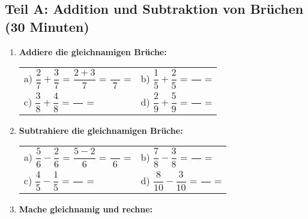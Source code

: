 \subsection*{Teil A: Addition und Subtraktion von Brüchen (30 Minuten)}

\begin{enumerate}[label=\arabic*.]
    \item \textbf{Addiere die gleichnamigen Brüche:}

    \vspace{0.5cm}
    \begin{tabular}{ll}
        a) $\dfrac{2}{7} + \dfrac{3}{7}$ = $\dfrac{2+3}{7}$ = $\dfrac{\phantom{00}}{7}$ = \underline{\hspace{3cm}} & 
        b) $\dfrac{1}{5} + \dfrac{2}{5}$ = $\dfrac{\phantom{00}}{\phantom{00}}$ = \underline{\hspace{3cm}} \\[4ex]
        c) $\dfrac{3}{8} + \dfrac{4}{8}$ = $\dfrac{\phantom{00}}{\phantom{00}}$ = \underline{\hspace{3cm}} & 
        d) $\dfrac{2}{9} + \dfrac{5}{9}$ = $\dfrac{\phantom{00}}{\phantom{00}}$ = \underline{\hspace{3cm}}
    \end{tabular}

    \vspace{1cm}

    \item \textbf{Subtrahiere die gleichnamigen Brüche:}

    \vspace{0.5cm}
    \begin{tabular}{ll}
        a) $\dfrac{5}{6} - \dfrac{2}{6}$ = $\dfrac{5-2}{6}$ = $\dfrac{\phantom{00}}{6}$ = \underline{\hspace{3cm}} & 
        b) $\dfrac{7}{8} - \dfrac{3}{8}$ = $\dfrac{\phantom{00}}{\phantom{00}}$ = \underline{\hspace{3cm}} \\[4ex]
        c) $\dfrac{4}{5} - \dfrac{1}{5}$ = $\dfrac{\phantom{00}}{\phantom{00}}$ = \underline{\hspace{3cm}} & 
        d) $\dfrac{8}{10} - \dfrac{3}{10}$ = $\dfrac{\phantom{00}}{\phantom{00}}$ = \underline{\hspace{3cm}}
    \end{tabular}

    \vspace{1cm}

    \item \textbf{Mache gleichnamig und rechne:}


\end{enumerate}
